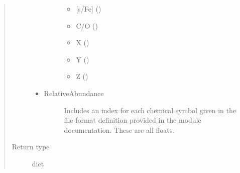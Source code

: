 \documentclass[letterpaper,10pt,english]{sphinxmanual}
\begin{document}
\begin{fulllineitems}
\begin{quote}
\begin{description}
\begin{itemize}
\begin{description}
\begin{itemize}
\item {} 
\sphinxAtStartPar
{[}s/Fe{]} ()

\item {} 
\sphinxAtStartPar
C/O ()

\item {} 
\sphinxAtStartPar
X ()

\item {} 
\sphinxAtStartPar
Y ()

\item {} 
\sphinxAtStartPar
Z ()

\end{itemize}

\end{description}

\item {} \begin{description}
\item[{RelativeAbundance}] \leavevmode
\sphinxAtStartPar
Includes an index for each chemical symbol given in the
file format definition provided in the module
documentation. These are all floats.

\end{description}

\end{itemize}


\item[{Return type}] \leavevmode
\sphinxAtStartPar
dict

\end{description}\end{quote}

\end{fulllineitems}

\end{document}
